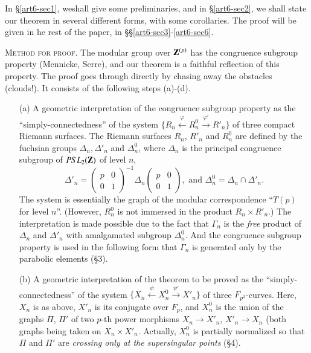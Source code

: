 In \S\ref{art6-sec1}, we\pageoriginale shall give some preliminaries, and in \S \ref{art6-sec2}, we shall state our theorem in several different forms, with some corollaries. The proof will be given in he rest of the paper, in \S\S \ref{art6-sec3}-\ref{art6-sec6}.

\textsc{Method for proof.} The modular group over $\mathbf{Z}^{(p)}$ has the congruence subgroup property (Mennicke, Serre), and our theorem is a faithful reflection of this property. The proof goes through directly by chasing away the obstacles (clouds!). It consists of the following steps (a)-(d).
\begin{itemize}
\item[(a)] A geometric interpretation of the congruence subgroup property as the ``simply-connectedness'' of the system $\{R_n \xleftarrow{\varphi} R^0_n \xrightarrow{\varphi'} R'_n\}$ of three compact Riemann surfaces. The Riemann surfaces $R_n$, $R'_n$ and $R^0_n$ are defined by the fuchsian groups $\Delta_n, \Delta'_n$ and $\Delta^0_n$, where $\Delta_n$ is the principal congruence subgroup of $PSL_2 (\mathbf{Z})$ of level $n$,
$$
\Delta'_n = 
\begin{pmatrix}
p & 0 \\
0 & 1
\end{pmatrix}^{-1}
\Delta_n 
\begin{pmatrix}
p & 0 \\
0 & 1
\end{pmatrix}, \text{ and }
\Delta^0_n = \Delta_n \cap \Delta'_n.
$$
The system is essentially the graph of the modular correspondence ``$T(p)$ for level $n$''. (However, $R^0_n$ is not immersed in the product $R_n \times R'_n$.) The interpretation is made possible due to the fact that $\Gamma_n$ is the \textit{free} product of $\Delta_n$ and $\Delta'_n$ with amalgamated subgroup $\Delta^0_n$. And the congruence subgroup property is used in the following form that $\Gamma_n$ is generated only by the parabolic elements (\S 3).


\item[(b)] A geometric interpretation of the theorem to be proved as the ``simply-connectedness'' of the system $\{X_n \xleftarrow{\psi} X^0_n\xrightarrow{\psi'} X'_n\}$ of three $F_{p^2}$-curves. Here, $X_n$ is as above, $X'_n$ is its conjugate over $F_p$, and $X^0_n$ is the union of the graphs $\Pi$, $\Pi'$ of two $p$-th power morphisms $X_n \to X'_n$, $X'_n \to X_n$ (both graphs being taken on $X_n \times X'_n$. Actually, $X^0_n$ is partially normalized so that $\Pi$ and $\Pi'$ are \textit{crossing only at the supersingular points} (\S 4).


\end{itemize}
